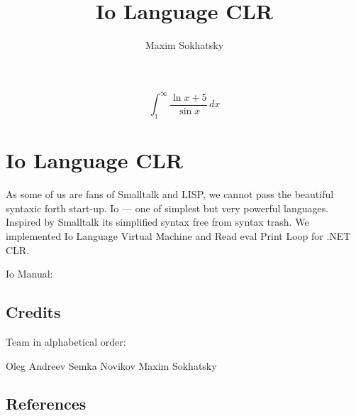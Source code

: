 \documentclass[11pt]{article}
\begin{document}

\title{Io Language CLR}
\author{Maxim Sokhatsky}

\paragraph{}
\paragraph{}
\begin{displaymath}
\int_1^\infty{\frac{\ln{x}+5}{\sin{x}}}\,dx
\end{displaymath}
\section*{Io Language CLR}

As some of us are fans of Smalltalk and LISP, we cannot pass the 
beautiful syntaxic forth start-up. Io --- one of simplest but very powerful
languages. Inspired by Smalltalk its simplified syntax free from
syntax trash. We implemented Io Language Virtual Machine and Read
eval Print Loop for .NET CLR.

Io Manual: 

\subsection*{Credits}

Team in alphabetical order:

Oleg Andreev \@br
Semka Novikov \@br
Maxim Sokhatsky                                                                                                   

\subsection*{References}
\end{document}
